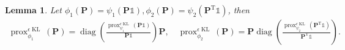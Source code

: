 \documentclass[11pt]{book}
\newtheorem{lemma}[theorem]{Lemma}
\begin{document}
\begin{lemma}\label{lemma:proximal_computation}
    Let $\phi_1(\mathbf{P}) = \psi_1(\mathbf{P}\mathbb{1}),
    \phi_2(\mathbf{P}) = \psi_2(\mathbf{P}^{\mathrm{T}}\mathbb{1})$, then
    \begin{align*}
        \operatorname{prox}_{\phi_1}^{\epsilon\operatorname{KL}}(\mathbf{P}) = \operatorname{diag}\left( \frac{\operatorname{prox}_{\psi_1}^{\epsilon\operatorname{KL}}(\mathbf{P}\mathbb{1})}{\mathbf{P}\mathbb{1}}  \right) \mathbf{P}, \quad 
        \operatorname{prox}_{\phi_2}^{\epsilon\operatorname{KL}}(\mathbf{P}) = \mathbf{P} \operatorname{diag}\left( \frac{\operatorname{prox}_{\psi_2}^{\epsilon\operatorname{KL}}(\mathbf{P}^{\mathrm{T}}\mathbb{1})}{\mathbf{P}^{\mathrm{T}}\mathbb{1}}  \right).
    \end{align*}
\end{lemma}
\end{document}
